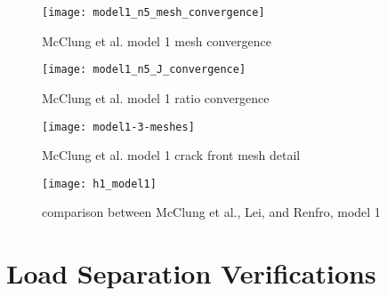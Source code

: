   \begin{figure}[tbp]
    \centering
    \texttt{[image: model1\_n5\_mesh\_convergence]}
    \caption{McClung et al. model 1 mesh convergence\label{fig:mesh-convergence}}
  \end{figure}
  \begin{figure}[tbp]
    \centering
    \texttt{[image: model1\_n5\_J\_convergence]}
    \caption{McClung et al. model 1 \J ratio convergence\label{fig:j-convergence}}
  \end{figure}

  \begin{figure}[tbp]
    \centering
    \texttt{[image: model1-3-meshes]}
    \caption{McClung et al. model 1 crack front mesh detail\label{fig:model1-3-meshes}}
  \end{figure}
  \begin{figure}[tbp]
    \centering
    \texttt{[image: h1\_model1]}
    \caption{\hone comparison between McClung et al., Lei, and Renfro, model 1 \label{fig:model1}}
  \end{figure}

\FloatBarrier
\section{Load Separation Verifications}
\label{sec:loadsepverification}


